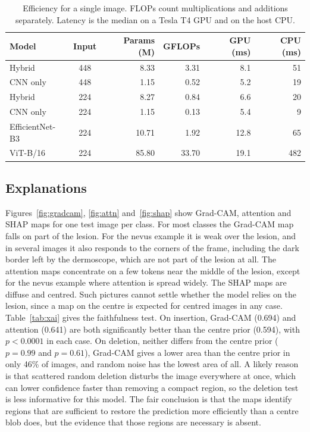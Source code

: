 \documentclass[runningheads]{llncs}
\begin{document}
\begin{table}[!htbp]
\centering
\caption{Efficiency for a single image. FLOPs count multiplications and additions separately. Latency is the median on a Tesla T4 GPU and on the host CPU.}
\label{tab:eff}
\small
\begin{tabular}{lcrrrr}
\toprule
Model & Input & Params (M) & GFLOPs & GPU (ms) & CPU (ms) \\
\midrule
Hybrid          & 448 & 8.33  & 3.31  & 8.1  & 51 \\
CNN only        & 448 & 1.15  & 0.52  & 5.2  & 19 \\
Hybrid          & 224 & 8.27  & 0.84  & 6.6  & 20 \\
CNN only        & 224 & 1.15  & 0.13  & 5.4  & 9 \\
EfficientNet-B3 & 224 & 10.71 & 1.92  & 12.8 & 65 \\
ViT-B/16        & 224 & 85.80 & 33.70 & 19.1 & 482 \\
\bottomrule
\end{tabular}
\end{table}

\subsection{Explanations}

Figures~\ref{fig:gradcam}, \ref{fig:attn} and~\ref{fig:shap} show Grad-CAM, attention and SHAP maps for one test image per class. For most classes the Grad-CAM map falls on part of the lesion. For the nevus example it is weak over the lesion, and in several images it also responds to the corners of the frame, including the dark border left by the dermoscope, which are not part of the lesion at all. The attention maps concentrate on a few tokens near the middle of the lesion, except for the nevus example where attention is spread widely. The SHAP maps are diffuse and centred. Such pictures cannot settle whether the model relies on the lesion, since a map on the centre is expected for centred images in any case. Table~\ref{tab:xai} gives the faithfulness test. On insertion, Grad-CAM (0.694) and attention (0.641) are both significantly better than the centre prior (0.594), with $p < 0.0001$ in each case. On deletion, neither differs from the centre prior ($p = 0.99$ and $p = 0.61$), Grad-CAM gives a lower area than the centre prior in only 46\% of images, and random noise has the lowest area of all. A likely reason is that scattered random deletion disturbs the image everywhere at once, which can lower confidence faster than removing a compact region, so the deletion test is less informative for this model. The fair conclusion is that the maps identify regions that are sufficient to restore the prediction more efficiently than a centre blob does, but the evidence that those regions are necessary is absent.
\end{document}
